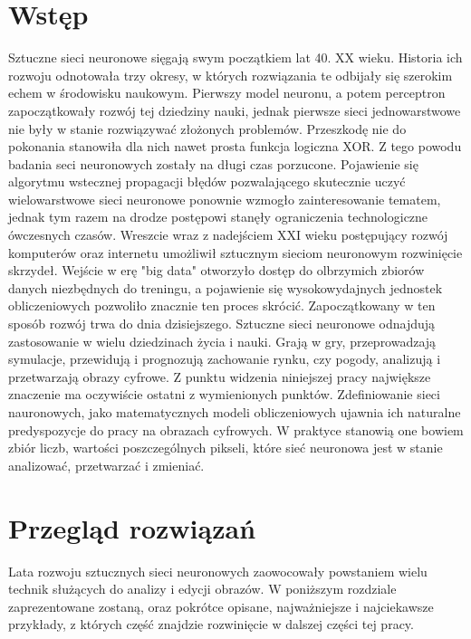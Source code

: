 \documentclass[12pt]{article}
\newcommand\tab[1][1cm]{\hspace*{#1}}
\begin{document}
  \section{Wstęp}
  \tab Sztuczne sieci neuronowe sięgają swym początkiem lat 40. XX wieku. Historia ich rozwoju odnotowała trzy okresy, w których rozwiązania te odbijały się szerokim echem w środowisku naukowym.
  \newline \tab Pierwszy model neuronu, a potem perceptron zapoczątkowały rozwój tej dziedziny nauki, jednak pierwsze sieci jednowarstwowe nie były w stanie rozwiązywać złożonych problemów. Przeszkodę nie do pokonania stanowiła dla nich nawet prosta funkcja logiczna XOR. Z tego powodu badania seci neuronowych zostały na długi czas porzucone.
  \newline \tab Pojawienie się algorytmu wstecznej propagacji błędów pozwalającego skutecznie uczyć wielowarstwowe sieci neuronowe ponownie wzmogło zainteresowanie tematem, jednak tym razem na drodze postępowi stanęły ograniczenia technologiczne ówczesnych czasów.
  \newline \tab Wreszcie wraz z nadejściem XXI wieku postępujący rozwój komputerów oraz internetu umożliwił sztucznym sieciom neuronowym rozwinięcie skrzydeł. Wejście w erę "big data" otworzyło dostęp do olbrzymich zbiorów danych niezbędnych do treningu, a pojawienie się wysokowydajnych jednostek obliczeniowych pozwoliło znacznie ten proces skrócić.
  \newline \tab Zapoczątkowany w ten sposób rozwój trwa do dnia dzisiejszego. Sztuczne sieci neuronowe odnajdują zastosowanie w wielu dziedzinach życia i nauki. Grają w gry, przeprowadzają symulacje, przewidują i prognozują zachowanie rynku, czy pogody, analizują i przetwarzają obrazy cyfrowe.
  \newline \tab Z punktu widzenia niniejszej pracy największe znaczenie ma oczywiście ostatni z wymienionych punktów. Zdefiniowanie sieci nauronowych, jako matematycznych modeli obliczeniowych ujawnia ich naturalne predyspozycje do pracy na obrazach cyfrowych. W praktyce stanowią one bowiem zbiór liczb, wartości poszczególnych pikseli, które sieć neuronowa jest w stanie analizować, przetwarzać i zmieniać.

\newpage
  \section{Przegląd rozwiązań}
  \tab Lata rozwoju sztucznych sieci neuronowych zaowocowały powstaniem wielu technik służących do analizy i edycji obrazów. W poniższym rozdziale zaprezentowane zostaną, oraz pokrótce opisane, najważniejsze i najciekawsze przykłady, z których część znajdzie rozwinięcie w dalszej części tej pracy.
\end{document}
